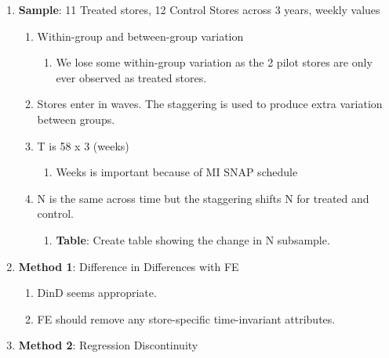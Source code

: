 \documentclass[12pt,letterpaperpaper,]{book}
\providecommand{\tightlist}{%
  \setlength{\itemsep}{0pt}\setlength{\parskip}{0pt}}
\begin{document}
\begin{enumerate}
\def\labelenumi{\arabic{enumi}.}
\setcounter{enumi}{1}
\tightlist
\item
  \textbf{Sample}: 11 Treated stores, 12 Control Stores across 3 years,
  weekly values

  \begin{enumerate}
  \def\labelenumii{\arabic{enumii}.}
  \setcounter{enumii}{2}
  \tightlist
  \item
    Within-group and between-group variation

    \begin{enumerate}
    \def\labelenumiii{\arabic{enumiii}.}
    \setcounter{enumiii}{3}
    \tightlist
    \item
      We lose some within-group variation as the 2 pilot stores are only
      ever observed as treated stores.
    \end{enumerate}
  \item
    Stores enter in waves. The staggering is used to produce extra
    variation between groups.
  \item
    T is 58 x 3 (weeks)

    \begin{enumerate}
    \def\labelenumiii{\arabic{enumiii}.}
    \setcounter{enumiii}{5}
    \tightlist
    \item
      Weeks is important because of MI SNAP schedule
    \end{enumerate}
  \item
    N is the same across time but the staggering shifts N for treated
    and control.

    \begin{enumerate}
    \def\labelenumiii{\arabic{enumiii}.}
    \setcounter{enumiii}{7}
    \tightlist
    \item
      \textbf{Table}: Create table showing the change in N subsample.\\
    \end{enumerate}
  \end{enumerate}
\item
  \textbf{Method 1}: Difference in Differences with FE

  \begin{enumerate}
  \def\labelenumii{\arabic{enumii}.}
  \setcounter{enumii}{4}
  \tightlist
  \item
    DinD seems appropriate.
  \item
    FE should remove any store-specific time-invariant attributes.
  \end{enumerate}
\item
  \textbf{Method 2}: Regression Discontinuity


\end{enumerate}
\end{document}
